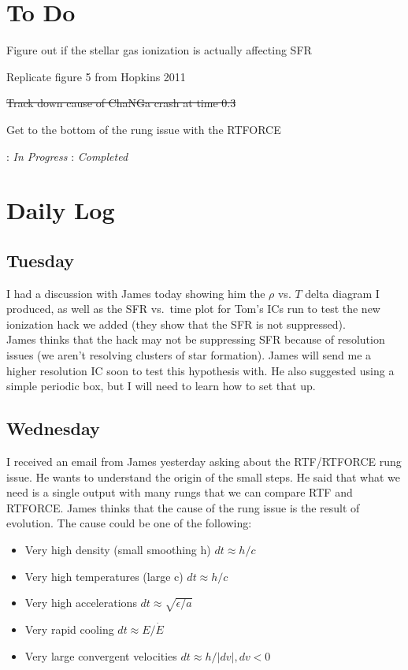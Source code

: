 \documentclass[11pt,letterpaper]{article}
\begin{document}
\section{To Do}
\begin{bullets}
\item[\checkmark] Figure out if the stellar gas ionization is actually affecting SFR
\item[\checkmark] Replicate figure 5 from Hopkins 2011
\item \sout{Track down cause of ChaNGa crash at time 0.3}
\item Get to the bottom of the rung issue with the RTFORCE
\end{bullets}

\textleaf : \textit{In Progress} \qquad \checkmark : \textit{Completed}
\section{Daily Log}

\subsection{Tuesday}

I had a discussion with James today showing him the $\rho$ vs. $T$ delta
diagram I produced, as well as the SFR vs.~time plot for Tom's ICs run
to test the new ionization hack we added (they show that the SFR is not
suppressed).\\James thinks that the hack may not be suppressing SFR
because of resolution issues (we aren't resolving clusters of star
formation). James will send me a higher resolution IC soon to test this
hypothesis with. He also suggested using a simple periodic box, but I
will need to learn how to set that up.

\subsection{Wednesday}

I received an email from James yesterday asking about the RTF/RTFORCE
rung issue. He wants to understand the origin of the small steps. He
said that what we need is a single output with many rungs that we can
compare RTF and RTFORCE. James thinks that the cause of the rung issue
is the result of evolution. The cause could be one of the following:

\begin{itemize}
\item
  Very high density (small smoothing h) $dt \approx h/c$
\item
  Very high temperatures (large c) $dt \approx h/c$
\item
  Very high accelerations $dt \approx \sqrt{\epsilon/a}$
\item
  Very rapid cooling $dt \approx E/\dot E$
\item
  Very large convergent velocities $dt \approx h/|dv|, dv < 0$
\end{itemize}
\end{document}
